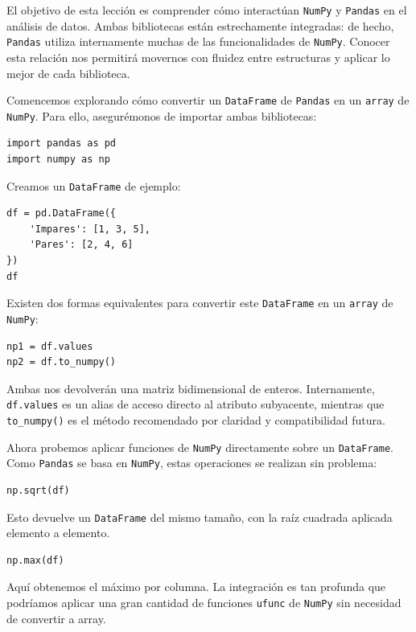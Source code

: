 \documentclass{article}
\theoremstyle{nonumberplain}
\begin{document}
El objetivo de esta lección es comprender cómo interactúan \texttt{NumPy} y \texttt{Pandas} en el análisis de datos. Ambas bibliotecas están estrechamente integradas: de hecho, \texttt{Pandas} utiliza internamente muchas de las funcionalidades de \texttt{NumPy}. Conocer esta relación nos permitirá movernos con fluidez entre estructuras y aplicar lo mejor de cada biblioteca.

Comencemos explorando cómo convertir un \texttt{DataFrame} de \texttt{Pandas} en un \texttt{array} de \texttt{NumPy}. Para ello, asegurémonos de importar ambas bibliotecas:

\begin{verbatim}
import pandas as pd
import numpy as np
\end{verbatim}

Creamos un \texttt{DataFrame} de ejemplo:

\begin{verbatim}
df = pd.DataFrame({
    'Impares': [1, 3, 5],
    'Pares': [2, 4, 6]
})
df
\end{verbatim}

Existen dos formas equivalentes para convertir este \texttt{DataFrame} en un \texttt{array} de \texttt{NumPy}:

\begin{verbatim}
np1 = df.values
np2 = df.to_numpy()
\end{verbatim}

Ambas nos devolverán una matriz bidimensional de enteros. Internamente, \texttt{df.values} es un alias de acceso directo al atributo subyacente, mientras que \texttt{to\_numpy()} es el método recomendado por claridad y compatibilidad futura.

Ahora probemos aplicar funciones de \texttt{NumPy} directamente sobre un \texttt{DataFrame}. Como \texttt{Pandas} se basa en \texttt{NumPy}, estas operaciones se realizan sin problema:

\begin{verbatim}
np.sqrt(df)
\end{verbatim}

Esto devuelve un \texttt{DataFrame} del mismo tamaño, con la raíz cuadrada aplicada elemento a elemento.

\begin{verbatim}
np.max(df)
\end{verbatim}

Aquí obtenemos el máximo por columna. La integración es tan profunda que podríamos aplicar una gran cantidad de funciones \texttt{ufunc} de \texttt{NumPy} sin necesidad de convertir a array.
\end{document}
